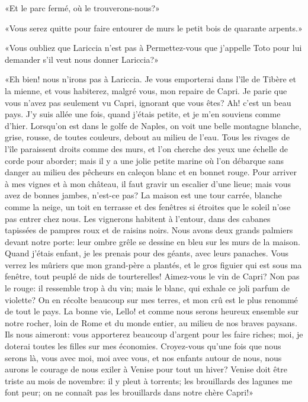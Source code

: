 «Et le parc fermé, où le trouverons-nous?»

«Vous serez quitte pour faire entourer de murs le petit bois de quarante
arpents.»

«Vous oubliez que Lariccia n'est pas à Permettez-vous que j'appelle Toto
pour lui demander s'il veut nous donner Lariccia?»

«Eh bien! nous n'irons pas à Lariccia. Je vous emporterai dans l'île de
Tibère et la mienne, et vous habiterez, malgré vous, mon repaire de
Capri. Je parie que vous n'avez pas seulement vu Capri, ignorant que
vous êtes? Ah! c'est un beau pays. J'y suis allée une fois, quand
j'étais petite, et je m'en souviens comme d'hier. Lorsqu'on est dans le
golfe de Naples, on voit une belle montagne blanche, grise, rousse, de
toutes couleurs, debout au milieu de l'eau. Tous les rivages de l'île
paraissent droits comme des murs, et l'on cherche des yeux une échelle
de corde pour aborder; mais il y a une jolie petite marine où l'on
débarque sans danger au milieu des pêcheurs en caleçon blanc et en
bonnet rouge. Pour arriver à mes vignes et à mon château, il faut gravir
un escalier d'une lieue; mais vous avez de bonnes jambes, n'est-ce pas?
La maison est une tour carrée, blanche comme la neige, un toit en
terrasse et des fenêtres si étroites que le soleil n'ose pas entrer chez
nous. Les vignerons habitent à l'entour, dans des cabanes tapissées de
pampres roux et de raisins noirs. Nous avons deux grands palmiers devant
notre porte: leur ombre grêle se dessine en bleu sur les murs de la
maison. Quand j'étais enfant, je les prenais pour des géants, avec leurs
panaches. Vous verrez les mûriers que mon grand-père a plantés, et le
gros figuier qui est sous ma fenêtre, tout peuplé de nids de
tourterelles! Aimez-vous le vin de Capri? Non pas le rouge: il ressemble
trop à du vin; mais le blanc, qui exhale ce joli parfum de violette? On
en récolte beaucoup sur mes terres, et mon crû est le plus renommé de
tout le pays. La bonne vie, Lello! et comme nous serons heureux ensemble
sur notre rocher, loin de Rome et du monde entier, au milieu de nos
braves paysans. Ils nous aimeront: vous apporterez beaucoup d'argent
pour les faire riches; moi, je doterai toutes les filles sur mes
économies. Croyez-vous qu'une fois que nous serons là, vous avec moi,
moi avec vous, et nos enfants autour de nous, nous aurons le courage de
nous exiler à Venise pour tout un hiver? Venise doit être triste au mois
de novembre: il y pleut à torrents; les brouillards des lagunes me font
peur; on ne connaît pas les brouillards dans notre chère Capri!»

